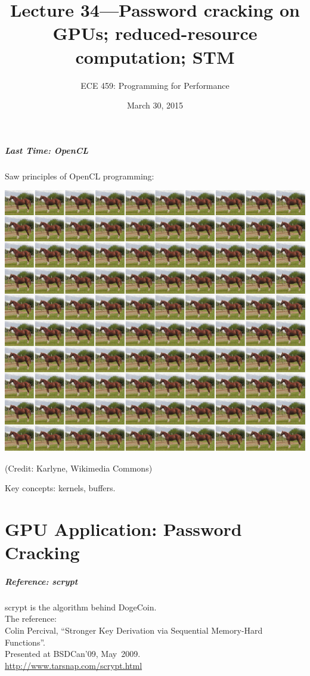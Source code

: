 \documentclass[aspectratio=43]{beamer}
\title{Lecture 34---Password cracking on GPUs; reduced-resource computation; STM}
\subtitle{ECE 459: Programming for Performance}
\date{March 30, 2015}
\newenvironment{changemargin}[1]{%
  \begin{list}{}{%
    \setlength{\topsep}{0pt}%
    \setlength{\leftmargin}{#1}%
    \setlength{\rightmargin}{1em}
    \setlength{\listparindent}{\parindent}%
    \setlength{\itemindent}{\parindent}%
    \setlength{\parsep}{\parskip}%
  }%
  \item[]}{\end{list}}
\begin{document}
\begin{frame}[plain]
  \titlepage
\end{frame}

\begin{frame}
  \frametitle{Last Time: OpenCL}

  Saw principles of OpenCL programming:

  \begin{center}
    \includegraphics[width=.6\textwidth]{L34/100-horses.jpg}
  \end{center}
  \hfill {\small (Credit: Karlyne, Wikimedia Commons)}

  Key concepts: kernels, buffers.
  
\end{frame}

\part{GPU Application: Password Cracking}
\frame{\partpage}

\begin{frame}
  \frametitle{Reference: scrypt}

  \begin{changemargin}{2cm}
    scrypt is the algorithm behind DogeCoin. \\[1em] The reference:\\[1em]
    
    Colin Percival, ``Stronger Key Derivation via Sequential Memory-Hard Functions''. \\
    Presented at BSDCan'09, May~2009.\\[1em]

    \url{http://www.tarsnap.com/scrypt.html}
  \end{changemargin}
\end{frame}
\end{document}

